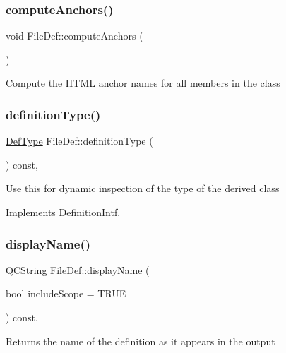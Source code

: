 \subsubsection{\texorpdfstring{computeAnchors()}{computeAnchors()}}
{\footnotesize\ttfamily void File\+Def\+::compute\+Anchors (\begin{DoxyParamCaption}{ }\end{DoxyParamCaption})}

Compute the H\+T\+ML anchor names for all members in the class \mbox{\label{class_file_def_a91629ee75b5caf817a7338c02a12bd0a}} 
\subsubsection{\texorpdfstring{definitionType()}{definitionType()}}
{\footnotesize\ttfamily \mbox{\hyperlink{class_definition_intf_ada60114bc621669dd8c19edfc6421766}{Def\+Type}} File\+Def\+::definition\+Type (\begin{DoxyParamCaption}{ }\end{DoxyParamCaption}) const\hspace{0.3cm}{\ttfamily [inline]}, {\ttfamily [virtual]}}

Use this for dynamic inspection of the type of the derived class 

Implements \mbox{\hyperlink{class_definition_intf_ac8ee00bc1af5558ae37f6896d16f5a3a}{Definition\+Intf}}.

\mbox{\label{class_file_def_ab5973477f072d780c9a184d16b58410b}} 
\subsubsection{\texorpdfstring{displayName()}{displayName()}}
{\footnotesize\ttfamily \mbox{\hyperlink{class_q_c_string}{Q\+C\+String}} File\+Def\+::display\+Name (\begin{DoxyParamCaption}\item[{bool}]{include\+Scope = {\ttfamily TRUE} }\end{DoxyParamCaption}) const\hspace{0.3cm}{\ttfamily [inline]}, {\ttfamily [virtual]}}

Returns the name of the definition as it appears in the output 


